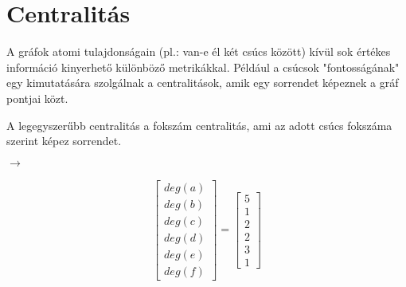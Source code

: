 \documentclass[12pt,numbers=noenddot]{report}
\begin{document}
\section{Centralitás}
A gráfok atomi tulajdonságain (pl.: van-e él két csúcs között) kívül sok értékes információ kinyerhető különböző metrikákkal. 
Például a csúcsok "fontosságának" egy kimutatására szolgálnak a centralitások, amik egy sorrendet képeznek a gráf pontjai közt. 

A legegyszerűbb centralitás a fokszám centralitás, ami az adott csúcs fokszáma szerint képez sorrendet.


\noindent
\begin{minipage}[c]{0.4\linewidth}


\end{minipage}
\noindent
\begin{minipage}[c]{0.2\linewidth}

\hspace{0.5cm}
$\rightarrow$

\end{minipage}
\begin{minipage}[c]{0.2\linewidth}

\begin{align}
	\begin{bmatrix}
		deg(a)\\
		deg(b)\\
		deg(c)\\
		deg(d)\\
		deg(e)\\
		deg(f)
	\end{bmatrix}
	=
	\begin{bmatrix}
		5\\
		1\\
		2\\
		2\\
		3\\
		1
	\end{bmatrix}
\end{align}

\end{minipage}
\end{document}

